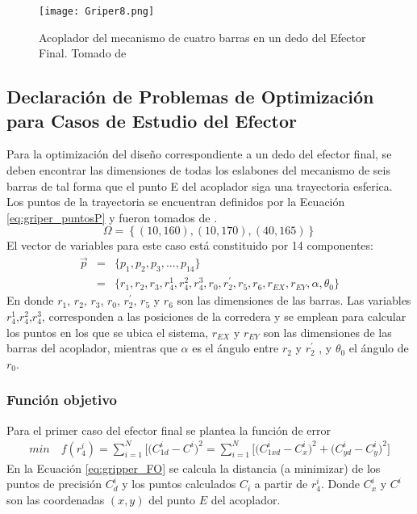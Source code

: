 \begin{figure}[htb]
    \centering
     \texttt{[image: Griper8.png]}
    \caption[Acoplador del mecanismo de cuatro barras en un dedo del Efector Final]{Acoplador del mecanismo de cuatro barras en un dedo del Efector Final. Tomado de \cite{zapata_zapata_control_2017} }
    \label{fig:Griper_MEC1}
\end{figure}
\subsection{Declaración de Problemas de Optimización para Casos de Estudio del Efector}
Para la optimización del diseño correspondiente a un dedo del efector final, se deben encontrar las dimensiones de todas los eslabones del mecanismo de seis barras de tal forma que el punto E del acoplador siga una trayectoria esferica. Los puntos de la trayectoria se encuentran definidos por la Ecuación \ref{eq:griper_puntosP} y fueron tomados de \cite{capistran_2015}.
\begin{equation} \label{eq:griper_puntosP}
 \Omega= \left\{(10, 160), (10, 170), (40, 165) \right\}
\end{equation}
El vector de variables para este caso está constituido por 14 componentes:
\begin{eqnarray}\label{eq:gripper_Vector variables MEC1}
\vec{p} &=& \{p_1,p_2,p_3,...,p_{14} \}\\
       &=& \{ r_1,r_2,r_3,r^1_4,r^2_4,r^3_4,r_0,r^{\prime}_2,r_5,r_6,r_{EX},r_{EY},\alpha,\theta_0 \} 
\end{eqnarray}
En donde $r_1$, $r_2$, $r_3$, $r_0$, $r^{\prime}_2$, $r_5$ y $r_6$ son las dimensiones de las barras. Las variables $r^1_4$,$r^2_4$,$r^3_4$, corresponden a las posiciones de la corredera y se emplean para calcular los puntos en los que se ubica el sistema, $r_{EX}$ y $r_{EY}$ son las dimensiones de las barras del acoplador, mientras que  $\alpha$ es el ángulo entre $r_2$ y $r^{\prime}_2$ , y $\theta_0$ el ángulo de $r_0$.
\subsubsection{Función objetivo}
Para el primer caso del efector final  se plantea la función de error 
\begin{equation}
 \begin{aligned}
min\quad  f(r^i_4)=\sum_{i=1}^{N}\big[\big(C^{i}_{1d}-C^{i} \big)^2=
\sum_{i=1}^{N}\big[\big(C^{i}_{1xd}-C^{i}_{x} \big)^2 +\big(C^{i}_{yd}-C^{i}_{y} \big)^2\big] 
\end{aligned}
\label{eq:gripper_FO}
\end{equation}
En la Ecuación \ref{eq:gripper_FO} se calcula la distancia (a minimizar) de los puntos de precisión $C^i_d$ y los puntos calculados $C_i$ a partir de $r^i_4$. Donde  $C^i_x$ y $C^i$ son las coordenadas $(x,y)$ del punto $E$ del acoplador.
